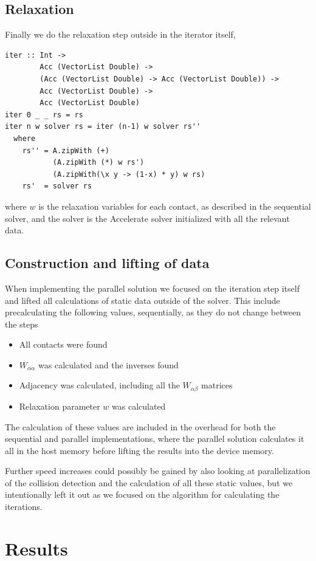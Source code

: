 \documentclass[runningheads,a4paper]{llncs}
\begin{document}
\subsection{Relaxation}
Finally we do the relaxation step outside in the iterator itself,
\begin{verbatim}
iter :: Int ->
        Acc (VectorList Double) ->
        (Acc (VectorList Double) -> Acc (VectorList Double)) ->
        Acc (VectorList Double) ->
        Acc (VectorList Double)
iter 0 _ _ rs = rs
iter n w solver rs = iter (n-1) w solver rs''
  where
    rs'' = A.zipWith (+)
           (A.zipWith (*) w rs')
           (A.zipWith(\x y -> (1-x) * y) w rs)
    rs'  = solver rs
\end{verbatim}
where $w$ is the relaxation variables for each contact,
as described in the sequential solver,
and the solver is the Accelerate solver initialized
with all the relevant data.

\subsection{Construction and lifting of data\label{dataconstruction}}
When implementing the parallel solution
we focused on the iteration step itself
and lifted all calculations of static data
outside of the solver.
This include precalculating the following values,
sequentially, as they do not change between the steps

\begin{itemize}
\item All contacts were found
\item $W_{\alpha\alpha}$ was calculated and the inverses found
\item Adjacency was calculated, including all the $W_{\alpha\beta}$ matrices
\item Relaxation parameter $w$ was calculated
\end{itemize}

The calculation of these values are included in the overhead for both
the sequential and parallel implementations,
where the parallel solution calculates it all in the host memory
before lifting the results into the device memory.

Further speed increases could possibly be gained
by also looking at parallelization of the collision detection
and the calculation of all these static values,
but we intentionally left it out as we focused on the algorithm
for calculating the iterations.

\section{Results}
\end{document}
